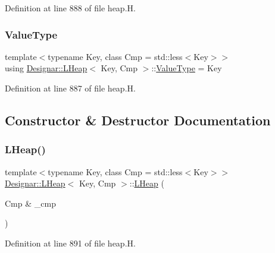 Definition at line 888 of file heap.\+H.

\mbox{\label{class_designar_1_1_l_heap_a7c24dbacc35909235f49057ffb3a8723}} 
\subsubsection{\texorpdfstring{Value\+Type}{ValueType}}
{\footnotesize\ttfamily template$<$typename Key, class Cmp = std\+::less$<$\+Key$>$$>$ \\
using \hyperlink{class_designar_1_1_l_heap}{Designar\+::\+L\+Heap}$<$ Key, Cmp $>$\+::\hyperlink{class_designar_1_1_l_heap_a7c24dbacc35909235f49057ffb3a8723}{Value\+Type} =  Key}



Definition at line 887 of file heap.\+H.



\subsection{Constructor \& Destructor Documentation}
\mbox{\label{class_designar_1_1_l_heap_ad645d2b25a8a0cbd4ccfcab02eee1740}} 
\subsubsection{\texorpdfstring{L\+Heap()}{LHeap()}\hspace{0.1cm}{\footnotesize\ttfamily [1/3]}}
{\footnotesize\ttfamily template$<$typename Key, class Cmp = std\+::less$<$\+Key$>$$>$ \\
\hyperlink{class_designar_1_1_l_heap}{Designar\+::\+L\+Heap}$<$ Key, Cmp $>$\+::\hyperlink{class_designar_1_1_l_heap}{L\+Heap} (\begin{DoxyParamCaption}\item[{Cmp \&}]{\+\_\+cmp }\end{DoxyParamCaption})\hspace{0.3cm}{\ttfamily [inline]}}



Definition at line 891 of file heap.\+H.

